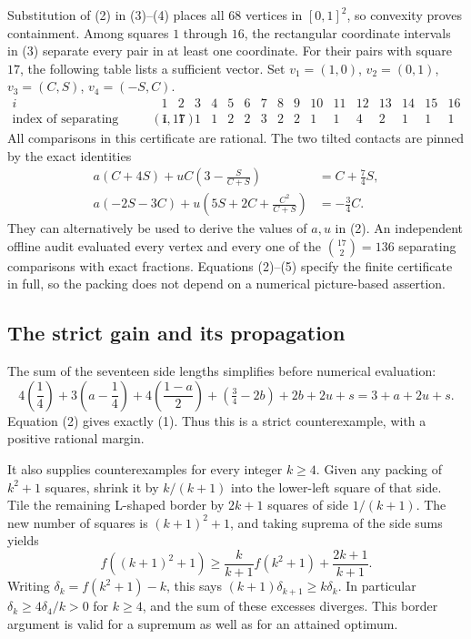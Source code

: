 Substitution of (2) in (3)--(4) places all $68$ vertices in $[0,1]^2$, so convexity proves containment. Among squares $1$ through $16$, the rectangular coordinate intervals in (3) separate every pair in at least one coordinate. For their pairs with square $17$, the following table lists a sufficient vector. Set $v_1=(1,0)$, $v_2=(0,1)$, $v_3=(C,S)$, $v_4=(-S,C)$.
\[
\begin{array}{c|rrrrrrrrrrrrrrrr}
i&1&2&3&4&5&6&7&8&9&10&11&12&13&14&15&16\\\hline
\text{index of separating vector for }(i,17)
&1&1&1&1&2&2&3&2&2&1&1&4&2&1&1&1
\end{array}
\tag{5}
\]
All comparisons in this certificate are rational. The two tilted contacts are pinned by the exact identities
\[
\begin{aligned}
a(C+4S)+uC\left(3-\frac S{C+S}\right)&=C+\frac74S,\\
a(-2S-3C)+u\left(5S+2C+\frac{C^2}{C+S}\right)&=-\frac34C.
\end{aligned}
\tag{6}
\]
They can alternatively be used to derive the values of $a,u$ in (2). An independent offline audit evaluated every vertex and every one of the $\binom{17}2=136$ separating comparisons with exact fractions. Equations (2)--(5) specify the finite certificate in full, so the packing does not depend on a numerical picture-based assertion.

\subsection{The strict gain and its propagation}
The sum of the seventeen side lengths simplifies before numerical evaluation:
\[
4\left(\frac14\right)+3\left(a-\frac14\right)
+4\left(\frac{1-a}{2}\right)+(\tfrac34-2b)+2b+2u+s
=3+a+2u+s.
\]
Equation (2) gives exactly (1). Thus this is a strict counterexample, with a positive rational margin.

It also supplies counterexamples for every integer $k\geq4$. Given any packing of $k^2+1$ squares, shrink it by $k/(k+1)$ into the lower-left square of that side. Tile the remaining L-shaped border by $2k+1$ squares of side $1/(k+1)$. The new number of squares is $(k+1)^2+1$, and taking suprema of the side sums yields
\[
f((k+1)^2+1)\geq\frac{k}{k+1}f(k^2+1)+\frac{2k+1}{k+1}.
\]
Writing $\delta_k=f(k^2+1)-k$, this says $(k+1)\delta_{k+1}\geq k\delta_k$. In particular $\delta_k\geq4\delta_4/k>0$ for $k\geq4$, and the sum of these excesses diverges. This border argument is valid for a supremum as well as for an attained optimum.

